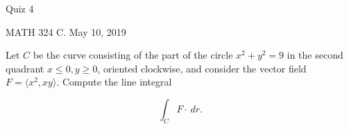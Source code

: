 \documentclass{exam}
\begin{document}
 
\begin{center} \begin{Large} Quiz 4\end{Large}

\vspace{5mm}
MATH 324 C. May 10, 2019
\end{center} 

\vspace{5mm}

\begin{center}
\end{center}

\vspace{1cm}
 

\vspace{1cm}

\begin{questions}
\question Let $C$ be the curve consisting of the part of the circle $x^2 + y^2 = 9$ in the second quadrant $x \leq 0, y \geq 0$, oriented clockwise, and consider the vector field $F = \langle x^2, xy \rangle$. Compute the line integral

\[
\int_C F \cdot \, dr.
\]

\end{questions}
\end{document}
